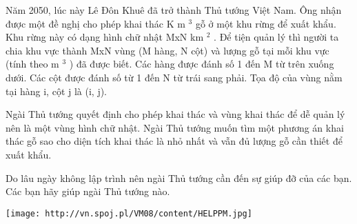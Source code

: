 Năm 2050, lúc này Lê Đôn Khuê đã trở thành Thủ tướng Việt Nam. Ông nhận được một đề nghị cho phép khai thác K m $^ 3 $ gỗ ở một khu rừng để xuất khẩu. Khu rừng này có dạng hình chữ nhật MxN km $^ 2 $ . Để tiện quản lý thì người ta chia khu vực thành MxN vùng (M hàng, N cột) và lượng gỗ tại mỗi khu vực (tính theo m $^ 3 $ ) đã được biết. Các hàng được đánh số 1 đến M từ trên xuống dưới. Các cột được đánh số từ 1 đến N từ trái sang phải. Tọa độ của vùng nằm tại hàng i, cột j là (i, j).

Ngài Thủ tướng quyết định cho phép khai thác và vùng khai thác để dễ quản lý nên là một vùng hình chữ nhật. Ngài Thủ tướng muốn tìm một phương án khai thác gỗ sao cho diện tích khai thác là nhỏ nhất và vẫn đủ lượng gỗ cần thiết để xuất khẩu.

Do lâu ngày không lập trình nên ngài Thủ tướng cần đến sự giúp đỡ của các bạn. Các bạn hãy giúp ngài Thủ tướng nào.


\texttt{[image: http://vn.spoj.pl/VM08/content/HELPPM.jpg]}

 